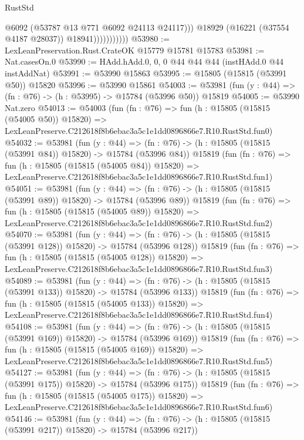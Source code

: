 \begin{lexlean}{RustStd}
\begin{coremodule}
                              @6092
                              (@53787 @13 @771 @6092 @24113 @24117)))
                          @18929
                          (@16221 (@37554 @4187 @28037))
                          @18941)))))))))))
@53980 := LexLeanPreservation.Rust.CrateOK @15779 @15781 @15783
@53981 := Nat.casesOn.{0}
@53990 := HAdd.hAdd.{0, 0, 0} @44 @44 @44 (instHAdd.{0} @44 instAddNat)
@53991 := @53990 @15863
@53995 := @15805 (@15815 (@53991 @50)) @15820
@53996 := @53990 @15861
@54003 := @53981 (fun (y : @44) => (fn : @76) -> (h : @53995) -> @15784 (@53996 @50)) @15819
@54005 := @53990 Nat.zero
@54013 := @54003
    (fun (fn : @76) =>
    fun (h : @15805 (@15815 (@54005 @50)) @15820) =>
    LexLeanPreserve.C212618f8b6ebac3a5c1e1dd0896866e7.R10.RustStd.fun0)
@54032 := @53981
    (fun (y : @44) =>
    (fn : @76) -> (h : @15805 (@15815 (@53991 @84)) @15820) -> @15784 (@53996 @84))
    @15819
    (fun (fn : @76) =>
    fun (h : @15805 (@15815 (@54005 @84)) @15820) =>
    LexLeanPreserve.C212618f8b6ebac3a5c1e1dd0896866e7.R10.RustStd.fun1)
@54051 := @53981
    (fun (y : @44) =>
    (fn : @76) -> (h : @15805 (@15815 (@53991 @89)) @15820) -> @15784 (@53996 @89))
    @15819
    (fun (fn : @76) =>
    fun (h : @15805 (@15815 (@54005 @89)) @15820) =>
    LexLeanPreserve.C212618f8b6ebac3a5c1e1dd0896866e7.R10.RustStd.fun2)
@54070 := @53981
    (fun (y : @44) =>
    (fn : @76) -> (h : @15805 (@15815 (@53991 @128)) @15820) -> @15784 (@53996 @128))
    @15819
    (fun (fn : @76) =>
    fun (h : @15805 (@15815 (@54005 @128)) @15820) =>
    LexLeanPreserve.C212618f8b6ebac3a5c1e1dd0896866e7.R10.RustStd.fun3)
@54089 := @53981
    (fun (y : @44) =>
    (fn : @76) -> (h : @15805 (@15815 (@53991 @133)) @15820) -> @15784 (@53996 @133))
    @15819
    (fun (fn : @76) =>
    fun (h : @15805 (@15815 (@54005 @133)) @15820) =>
    LexLeanPreserve.C212618f8b6ebac3a5c1e1dd0896866e7.R10.RustStd.fun4)
@54108 := @53981
    (fun (y : @44) =>
    (fn : @76) -> (h : @15805 (@15815 (@53991 @169)) @15820) -> @15784 (@53996 @169))
    @15819
    (fun (fn : @76) =>
    fun (h : @15805 (@15815 (@54005 @169)) @15820) =>
    LexLeanPreserve.C212618f8b6ebac3a5c1e1dd0896866e7.R10.RustStd.fun5)
@54127 := @53981
    (fun (y : @44) =>
    (fn : @76) -> (h : @15805 (@15815 (@53991 @175)) @15820) -> @15784 (@53996 @175))
    @15819
    (fun (fn : @76) =>
    fun (h : @15805 (@15815 (@54005 @175)) @15820) =>
    LexLeanPreserve.C212618f8b6ebac3a5c1e1dd0896866e7.R10.RustStd.fun6)
@54146 := @53981
    (fun (y : @44) =>
    (fn : @76) -> (h : @15805 (@15815 (@53991 @217)) @15820) -> @15784 (@53996 @217))

\end{coremodule}
\end{lexlean}

